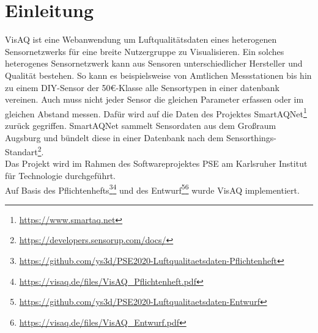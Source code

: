 \section{Einleitung}
VisAQ ist eine Webanwendung um Luftqualitätsdaten eines heterogenen \gls{Sensor}netzwerks für eine breite Nutzergruppe zu Visualisieren.
Ein solches heterogenes Sensornetzwerk kann aus Sensoren unterschiedlicher Hersteller und Qualität bestehen.
So kann es beispielsweise von Amtlichen Messstationen bis hin zu einem DIY-Sensor der 50\euro-Klasse alle Sensortypen in einer datenbank vereinen.
Auch muss nicht jeder Sensor die gleichen Parameter erfassen oder im gleichen Abstand messen.
Dafür wird auf die Daten des Projektes SmartAQNet\footnote{\url{https://www.smartaq.net}} zurück gegriffen.
SmartAQNet sammelt Sensordaten aus dem Großraum Augsburg und bündelt diese in einer Datenbank nach dem Sensorthings-Standart\footnote{\url{https://developers.sensorup.com/docs/}}.
\\
Das Projekt wird im Rahmen des Softwareprojektes PSE am Karlsruher Institut für Technologie durchgeführt.
\\
Auf Basis des Pflichtenhefts\footnote{\url{https://github.com/ys3d/PSE2020-Luftqualitaetsdaten-Pflichtenheft}}\footnote{\url{https://visaq.de/files/VisAQ_Pflichtenheft.pdf}} und des Entwurf\footnote{\url{https://github.com/ys3d/PSE2020-Luftqualitaetsdaten-Entwurf}}\footnote{\url{https://visaq.de/files/VisAQ_Entwurf.pdf}} wurde VisAQ implementiert.
\\
